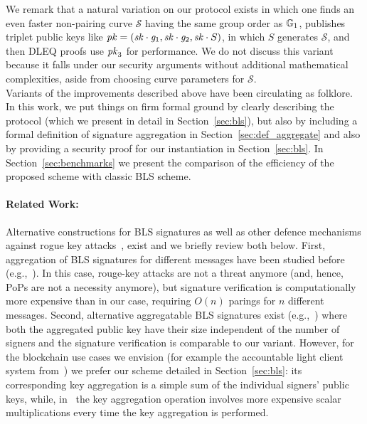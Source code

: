 We remark that a natural variation on our protocol exists in which
one finds an even faster non-pairing curve $\mathcal{S}$ having the same
group order as $\mathbb{G}_{1}$,  publishes triplet public keys like
$\mathit{pk} = (\mathit{sk} \cdot \mathit{g}_{1}, \mathit{sk} \cdot \mathit{g}_{2}, \mathit{sk} \cdot S)$, in which $S$ generates
$\mathcal{S}$, and then DLEQ proofs use $\mathit{pk}_3$ for performance.
We do not discuss this variant because it falls under our security
arguments without additional mathematical complexities,
aside from choosing curve parameters for $\mathcal{S}$. \\

Variants of the improvements described above have been circulating as folklore. 
In this work, we put things on firm formal ground by clearly describing the protocol (which we present in detail in Section~\ref{sec:bls}), but also 
by including a formal definition of signature aggregation in Section~\ref{sec:def_aggregate} and also by providing a security proof for our instantiation in Section~\ref{sec:bls}. 
In Section~\ref{sec:benchmarks} we present the comparison of the efficiency of the proposed scheme with classic BLS scheme. \\ 
 
\paragraph{Related Work:} Alternative constructions for BLS signatures as well as other defence mechanisms against 
rogue key attacks~\cite{proofs_of_posession}, exist and we briefly review both below. First, aggregation of BLS signatures for different messages have been studied before
(e.g.,~\cite{aggregate_BLS_signatures}). In this case, rouge-key attacks are not a threat anymore (and, hence, PoPs are not a necessity anymore), 
but signature verification is computationally more expensive than in our case, requiring $O(n)$ parings for $n$ different messages. Second, alternative aggregatable 
BLS signatures exist (e.g.,~\cite{boneh_compact_multisig}) where both the aggregated public key have their size independent 
of the number of signers and the signature verification is comparable to our variant. However, for the blockchain use cases we envision 
(for example the accountable light client system from~\cite{ourLC}) we prefer our scheme detailed in Section~\ref{sec:bls}: its corresponding key aggregation is a simple sum 
of the individual signers' public keys, while, in~\cite{boneh_compact_multisig} the key aggregation operation involves more expensive scalar 
multiplications every time the key aggregation is performed.
